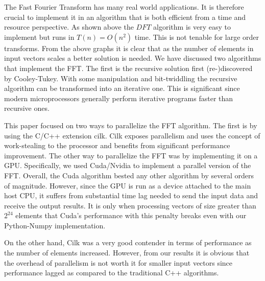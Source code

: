 The Fast Fourier Transform has many real world applications. It is therefore crucial to implement it in an algorithm that is both efficient from a time and resource perspective. As shown above the $DFT$ algorithm is very easy to implement but runs in $T(n) = O(n^2)$ time. This is not tenable for large order transforms. From the above graphs it is clear that as the number of elements in input vectors scales a better solution is needed. We have discussed two algorithms that implement the FFT. The first is the recursive solution first (re-)discovered by Cooley-Tukey. With some manipulation and bit-twiddling the recursive algorithm can be transformed into an iterative one. This is significant since modern microprocessors generally perform iterative programs faster than recursive ones. 

This paper focused on two ways to parallelize the FFT algorithm. The first is by using the C/C++ extension cilk. Cilk exposes parallelism and uses the concept of work-stealing to the processor and benefits from significant performance improvement. The other way to parallelize the FFT was by implementing it on a GPU. Specifically, we used Cuda/Nvidia to implement a parallel version of the FFT. Overall, the Cuda algorithm bested any other algorithm by several orders of magnitude. However, since the GPU is run as a device attached to the main host CPU, it suffers from substantial time lag needed to send the input data and receive the output results. It is only when processing vectors of size greater than $2^{24}$ elements that Cuda's performance with this penalty breaks even with our Python-Numpy implementation. 

On the other hand, Cilk was a very good contender in terms of performance as the number of elements increased. However, from our results it is obvious that the overhead of parallelism is not worth it for smaller input vectors since performance lagged as compared to the traditional C++ algorithms. 